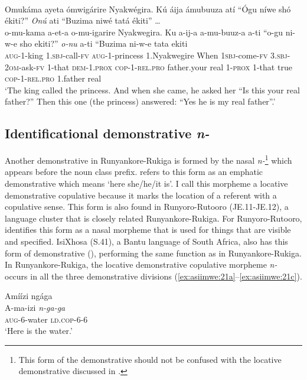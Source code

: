 \documentclass[output=paper 		  ]{langscibook}
\begin{document}
\ea%
    \label{ex:asiimwe:20} \citet[186]{Asiimwe2014}\\
    Omukáma ayeta ómwigárire Nyakwégira. Kú áija ámubuuza atí “Ógu níwe shó ékiti?” \emph{Onú} ati “Buzima niwé tatá ékiti” \ldots \citep[31]{Mubangizi1966}\\
    \gll o-mu-kama  a-et-a  o-mu-igarire  Nyakwegira.  Ku  a-ij-a a-mu-buuz-a  a-ti  “o-gu  ni-w-e  sho    ekiti?” \emph{o-nu}  a-ti  “Buzima  ni-w-e  tata  ekiti\\
\textsc{aug}{}-1-king  \textsc{1.sbj}{}-call-\textsc{fv}  \textsc{aug}{}-1-princess  1.Nyakwegire  When  \textsc{1sbj-}come-\textsc{fv} \textsc{3.sbj-2om}{}-ask-\textsc{fv}  1-that  \textsc{dem}{}-1.\textsc{prox}  \textsc{cop}{}-1-\textsc{rel.pro}  father.your  real 1-\textsc{prox}  1-that  true  \textsc{cop-1-rel.pro}  1.father  real\\
\glt ‘The king called the princess. And when she came, he asked her “Is this your real father?” Then this one (the princess) answered: “Yes he is my real father”.’
\z

\subsection{Identificational demonstrative \textit{n-}}\label{sec:asiimwe:2.4}

Another demonstrative in Run\-yan\-ko\-re-Ru\-ki\-ga is formed by the nasal \textit{n-}\footnote{This form of the demonstrative should not be confused with the locative demonstrative discussed in .} which appears before the noun class prefix. \citet[138]{Taylor1985} refers to this form as an emphatic demonstrative which means ‘here she/he/it is’. I call this morpheme a locative demonstrative copulative because it marks the location of a referent with a copulative sense. This form is also found in Runyoro-Rutooro (JE.11-JE.12), a language cluster that is closely related Run\-yan\-ko\-re-Ru\-ki\-ga. For Runyoro-Rutooro, \citet{Rubongoya1999} identifies this form as a nasal morpheme that is used for things that are visible and specified. IsiXhosa (S.41), a Bantu language of South Africa, also has this form of demonstrative (\citealt{DuPlessisEtAl1992}), performing the same function as in Run\-yan\-ko\-re-Ru\-ki\-ga. In Run\-yan\-ko\-re-Ru\-ki\-ga, the locative demonstrative copulative morpheme \textit{n-} occurs in all the three demonstrative divisions (\ref{ex:asiimwe:21a}--\ref{ex:asiimwe:21c}).

 \ea\label{ex:asiimwe:21}
    \ea\label{ex:asiimwe:21a}   Amíízi ngága\\
  \gll A-ma-izi  \emph{n-ga-ga}\\
  \textsc{aug}{}-6-water  \textsc{ld.cop}{}-6-6\\
  \glt ‘Here is the water.’
\end{document}

